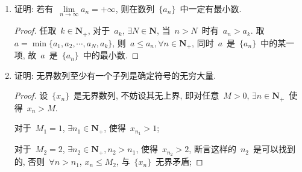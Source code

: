 \documentclass[UTF8,a4paper,10pt,twoside]{book}
\begin{document}
\begin{enumerate}
\begin{proof}
		      举一个无最小数的例子: $x_n=1+1/n, n\in\mathbf{N}_{+}$.\qedhere
	      \end{proof}
	\item 证明: 若有~$\lim\limits_{n\to\infty} a_n=+\infty$, 则在数列~$\{a_n\}$~中一定有最小数.
	      \begin{proof}
		      任取~$k\in\mathbf{N}_{+}$, 对于~$a_k$, $\exists N\in\mathbf{N}$, 当~$n>N$~时有~$a_n>a_k$. 取~$a=\min\{a_1,a_2,\cdots,a_N,a_k\}$, 则~$a\leqslant a_n, \forall n\in\mathbf{N}_{+}$, 同时~$a$~是~$\{a_n\}$~中的某一项, 故~$a$~是~$\{a_n\}$~中的最小数.\qedhere
	      \end{proof}
	\item 证明: 无界数列至少有一个子列是确定符号的无穷大量.
	      \begin{proof}
		      设~$\{x_n\}$~是无界数列, 不妨设其无上界, 即对任意~$M>0$, $\exists n\in\mathbf{N}_{+}$~使得~$x_n>M$.

		      对于~$M_1=1$, $\exists n_1\in\mathbf{N}_{+}$, 使得~$x_{n_1}>1$;

		      对于~$M_2=2$, $\exists n_2\in\mathbf{N}_{+}, n_2>n_1$, 使得~$x_{n_2}>2$, 断言这样的~$n_2$~是可以找到的, 否则~$\forall n>n_1$, $x_n\leqslant M_2$, 与~$\{x_n\}$~无界矛盾;


\end{proof}
\end{enumerate}
\end{document}
